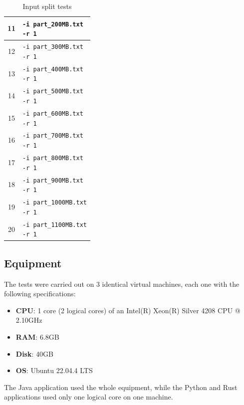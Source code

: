 \documentclass{article}
\begin{document}
\begin{multicols}{2}
\begin{table}[H]
\begin{tabular}{|c|l|}
            \hline      
            11 & \makecell[l]{\texttt{-i part\_200MB.txt} \\ \texttt{-r 1}} \\  
            \hline      
            12 & \makecell[l]{\texttt{-i part\_300MB.txt} \\ \texttt{-r 1}} \\        
            \hline
            13 & \makecell[l]{\texttt{-i part\_400MB.txt} \\ \texttt{-r 1}} \\        
            \hline
            14 & \makecell[l]{\texttt{-i part\_500MB.txt} \\ \texttt{-r 1}} \\        
            \hline
            15 & \makecell[l]{\texttt{-i part\_600MB.txt} \\ \texttt{-r 1}} \\        
            \hline
            16 & \makecell[l]{\texttt{-i part\_700MB.txt} \\ \texttt{-r 1}} \\        
            \hline
            17 & \makecell[l]{\texttt{-i part\_800MB.txt} \\ \texttt{-r 1}} \\        
            \hline
            18 & \makecell[l]{\texttt{-i part\_900MB.txt} \\ \texttt{-r 1}} \\        
            \hline
            19 & \makecell[l]{\texttt{-i part\_1000MB.txt} \\ \texttt{-r 1}} \\        
            \hline
            20 & \makecell[l]{\texttt{-i part\_1100MB.txt} \\ \texttt{-r 1}} \\            
            \hline
        \end{tabular}
        \caption{Input split tests}
        \label{tab:input_split_tests}
    \end{table}
    \subsection{Equipment}
        The tests were carried out on 3 identical virtual machines, each one with the following specifications:
        \begin{itemize}
            \item \textbf{CPU}: 1 core (2 logical cores) of an Intel(R) Xeon(R) Silver 4208 CPU @ 2.10GHz
            \item \textbf{RAM}: 6.8GB
            \item \textbf{Disk}: 40GB
            \item \textbf{OS}: Ubuntu 22.04.4 LTS
        \end{itemize}
        The Java application used the whole equipment, while the Python and Rust applications used only one 
        logical core on one machine.

\end{multicols}
\end{document}
